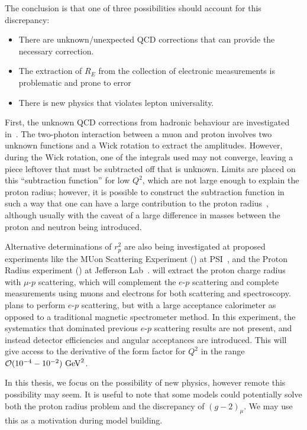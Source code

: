 The conclusion is that one of three possibilities should account for this discrepancy:

\begin{itemize}
    \item There are unknown/unexpected QCD corrections that can provide the necessary correction.
    \item The extraction of $R_E$ from the collection of electronic measurements is problematic and prone to error
    \item There is new physics that violates lepton universality.
\end{itemize}

First, the unknown QCD corrections from hadronic behaviour are investigated in~\cite{Carlson:2015jba}.
The two-photon interaction between a muon and proton involves two unknown functions and a Wick rotation to extract the amplitudes.
However, during the Wick rotation, one of the integrals used may not converge, leaving a piece leftover that must be subtracted off that is unknown.
Limits are placed on this ``subtraction function'' for low $Q^2$, which are not large enough to explain the proton radius; however, it is possible to construct the subtraction function in such a way that one can have a large contribution to the proton radius~\cite{Miller:2012ne}, although usually with the caveat of a large difference in masses between the proton and neutron being introduced.

Alternative determinations of $r_p^2$ are also being investigated at proposed experiments like the MUon Scattering Experiment (\muse) at PSI~\cite{Mesick:2015gta}, and the Proton Radius experiment (\prad) at Jefferson Lab~\cite{Gasparian:2014rna}. 
\muse will extract the proton charge radius with $\mu\textrm{-}p$ scattering, which will complement the $e\textrm{-}p$ scattering and complete measurements using muons and electrons for both scattering and spectroscopy.
\prad plans to perform $e\textrm{-}p$ scattering, but with a large acceptance calorimeter as opposed to a traditional magnetic spectrometer method.
In this experiment, the systematics that dominated previous $e\textrm{-}p$ scattering results are not present, and instead detector efficiencies and angular acceptances are introduced.
This will give access to the derivative of the form factor for $Q^2$ in the range $\operatorname{\mathcal{O}}(10^{-4} - 10^{-2})~\textrm{GeV}^2$.

In this thesis, we focus on the possibility of new physics, however remote this possibility may seem.
It is useful to note that some models could potentially solve both the proton radius problem and the discrepancy of $(g-2)_\mu$.
We may use this as a motivation during model building.
